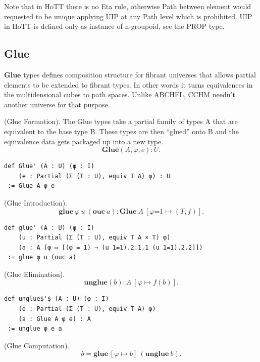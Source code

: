 \documentclass{article}
\begin{document}
Note that in HoTT there is no Eta rule, otherwise
Path between element would requested to be unique applying
UIP at any Path level which is prohibited. UIP in HoTT
is defined only as instance of n-groupoid, see the PROP type.


\newpage
\subsection{Glue}

$\mathbf{Glue}$ types defines composition structure for fibrant
universes that allows partial elements to be extended
to fibrant types. In other words it turns equivalences
in the multidensional cubes to path spaces.
Unlike ABCHFL, CCHM needn't another universe for that purpose.

\begin{definition} (Glue Formation).
The Glue types take a partial family of types A that are equivalent
to the base type B. These types are then “glued” onto B and the
equivalence data gets packaged up into a new type.
$$
  \mathbf{Glue}(A,\varphi,e) : U.
$$
\begin{lstlisting}[mathescape=true]
def Glue' (A : U) (φ : I)
    (e : Partial (Σ (T : U), equiv T A) φ) : U
 := Glue A φ e
\end{lstlisting}
\end{definition}

\begin{definition} (Glue Introduction).
$$
  \mathbf{glue}\ \varphi\ u\ (\mathbf{ouc}\ a) : \mathbf{Glue}\ A\ [\varphi\mbox{=}1 \mapsto (T,f)].
$$
\begin{lstlisting}[mathescape=true]
def glue' (A : U) (φ : I)
    (u : Partial (Σ (T : U), equiv T A × T) φ)
    (a : A [φ ↦ [(φ = 1) → (u 1=1).2.1.1 (u 1=1).2.2]])
 := glue φ u (ouc a)
\end{lstlisting}
\end{definition}

\begin{definition} (Glue Elimination).
$$
  \mathbf{unglue}(b) : A\ [\varphi \mapsto f(b) ].
$$
\begin{lstlisting}[mathescape=true]
def unglue$'$ (A : U) (φ : I)
    (e : Partial (Σ (T : U), equiv T A) φ)
    (a : Glue A φ e) : A
 := unglue φ e a
\end{lstlisting}
\end{definition}

\begin{theorem} (Glue Computation).
$$
  b = \mathbf{glue}\ [\varphi \mapsto b]\ (\mathbf{unglue}\ b).
$$
\end{theorem}
\end{document}
